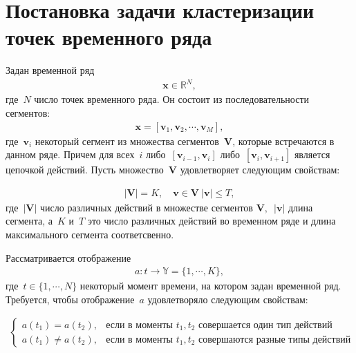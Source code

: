 \documentclass[12pt, twoside]{article}
\numberwithin{equation}{section}
\begin{document}
\section{Постановка задачи кластеризации точек временного ряда}

Задан временной ряд
\begin{equation}
\label{eq:st:1}
\begin{aligned}
\textbf{x} \in \mathbb{R}^{N},
\end{aligned}
\end{equation}
где~$N$ число точек временного ряда. Он состоит из последовательности сегментов:
\begin{equation}
\label{eq:st:2}
\begin{aligned}
\textbf{x} = [\textbf{v}_1, \textbf{v}_2, \cdots, \textbf{v}_M],
\end{aligned}
\end{equation}
где~$\textbf{v}_i$ некоторый сегмент из множества сегментов~$\mathbf{V}$, которые встречаются в данном ряде. 
Причем для всех~$i$ либо~$[\textbf{v}_{i-1},\textbf{v}_{i}]$ либо~$[\textbf{v}_{i},\textbf{v}_{i+1}]$  является цепочкой действий. Пусть множество~$\mathbf{V}$ удовлетворяет следующим свойствам:

\begin{equation}
\label{eq:st:3}
\begin{aligned}
\left|\mathbf{V}\right| = K, \quad \textbf{v} \in \mathbf{V}~\left|\textbf{v}\right| \leq T,
\end{aligned}
\end{equation}
где~$\left|\mathbf{V}\right|$ число различных действий в множестве сегментов $\mathbf{V},$~$\left|\textbf{v}\right|$ длина сегмента, а~$K$ и~$T$ это число различных действий во временном ряде и длина максимального сегмента соответсвенно.

Рассматривается отображение
\begin{equation}
\label{eq:st:4}
\begin{aligned}
a : t \to \mathbb{Y} = \{1,\cdots, K\}, 
\end{aligned}
\end{equation}
где~$t \in \{1,\cdots, N\}$ некоторый момент времени, на котором задан временной ряд.
Требуется, чтобы отображение~$a$ удовлетворяло следующим свойствам:

\begin{equation}
\label{eq:st:5}
\begin{aligned}
\begin{cases}
    a\left(t_1\right) = a\left(t_2\right), &  \text{если в моменты } t_1, t_2 \text{ совершается один тип действий}\\
    a\left(t_1\right) \not= a\left(t_2\right), &  \text{если в моменты } t_1, t_2 \text{ совершаются разные типы действий }
\end{cases}
\end{aligned}
\end{equation}
\end{document}
